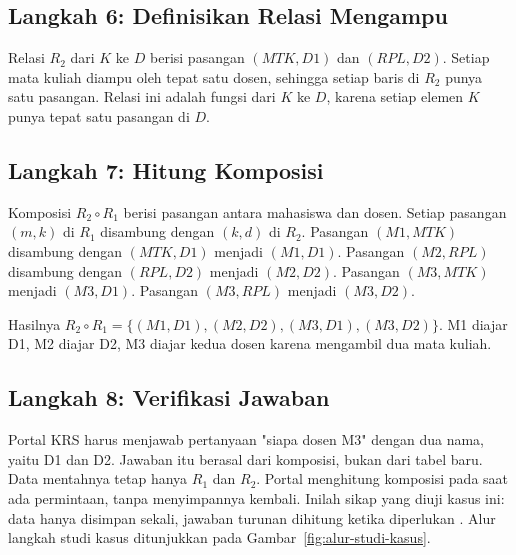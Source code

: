 \documentclass[11pt,a4paper]{article}
\begin{document}
\subsection{Langkah 6: Definisikan Relasi Mengampu}

Relasi $R_2$ dari $K$ ke $D$ berisi pasangan $(MTK,D1)$ dan $(RPL,D2)$. Setiap mata kuliah diampu oleh tepat satu dosen, sehingga setiap baris di $R_2$ punya satu pasangan. Relasi ini adalah fungsi dari $K$ ke $D$, karena setiap elemen $K$ punya tepat satu pasangan di $D$.

\subsection{Langkah 7: Hitung Komposisi}

Komposisi $R_2 \circ R_1$ berisi pasangan antara mahasiswa dan dosen. Setiap pasangan $(m,k)$ di $R_1$ disambung dengan $(k,d)$ di $R_2$. Pasangan $(M1,MTK)$ disambung dengan $(MTK,D1)$ menjadi $(M1,D1)$. Pasangan $(M2,RPL)$ disambung dengan $(RPL,D2)$ menjadi $(M2,D2)$. Pasangan $(M3,MTK)$ menjadi $(M3,D1)$. Pasangan $(M3,RPL)$ menjadi $(M3,D2)$.

Hasilnya $R_2 \circ R_1=\{(M1,D1),(M2,D2),(M3,D1),(M3,D2)\}$. M1 diajar D1, M2 diajar D2, M3 diajar kedua dosen karena mengambil dua mata kuliah.

\subsection{Langkah 8: Verifikasi Jawaban}

Portal KRS harus menjawab pertanyaan "siapa dosen M3" dengan dua nama, yaitu D1 dan D2. Jawaban itu berasal dari komposisi, bukan dari tabel baru. Data mentahnya tetap hanya $R_1$ dan $R_2$. Portal menghitung komposisi pada saat ada permintaan, tanpa menyimpannya kembali. Inilah sikap yang diuji kasus ini: data hanya disimpan sekali, jawaban turunan dihitung ketika diperlukan \cite{silberschatz}. Alur langkah studi kasus ditunjukkan pada Gambar~\ref{fig:alur-studi-kasus}.
\end{document}
